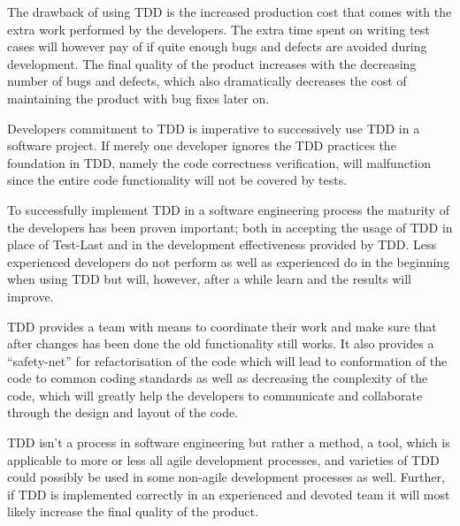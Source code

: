 The drawback of using TDD is the increased production cost that comes with the extra work performed by the developers. The extra time spent on writing test cases will however pay of if quite enough bugs and defects are avoided during development. The final quality of the product increases with the decreasing number of bugs and defects, which also dramatically decreases the cost of maintaining the product with bug fixes later on.

Developers commitment to TDD is imperative to successively use TDD in a software project. If merely one developer ignores the TDD practices the foundation in TDD, namely the code correctness verification, will malfunction since the entire code functionality will not be covered by tests.

To successfully implement TDD in a software engineering process the maturity of the developers has been proven important; both in accepting the usage of TDD in place of Test-Last and in the development effectiveness provided by TDD. Less experienced developers do not perform as well as experienced do in the beginning when using TDD but will, however, after a while learn and the results will improve.
  	
TDD provides a team with means to coordinate their work and make sure that after changes has been done the old functionality still works. It also provides a ``safety-net'' for refactorisation of the code which will lead to conformation of the code to common coding standards as well as decreasing the complexity of the code, which will greatly help the developers to communicate and collaborate through the design and layout of the code.
	  	
TDD isn't a process in software engineering but rather a method, a tool, which is applicable to more or less all agile development processes, and varieties of TDD could possibly be used in some non-agile development processes as well. Further, if TDD is implemented correctly in an experienced and devoted team it will most likely increase the final quality of the product.  